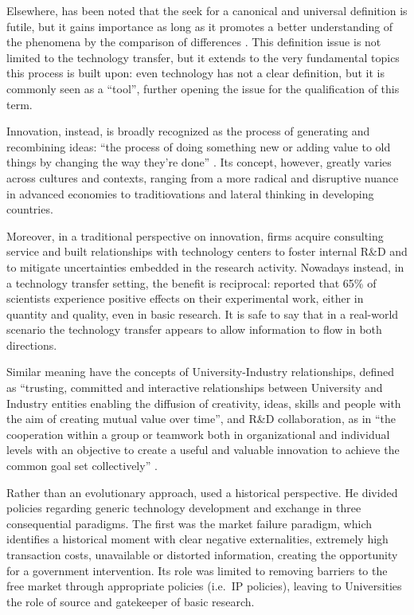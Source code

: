 Elsewhere, has been noted that the seek for a canonical and universal definition is futile, but it gains importance as long as it promotes a better understanding of the phenomena by the comparison of differences \citep{Bozeman2000}. This definition issue is not limited to the technology transfer, but it extends to the very fundamental topics this process is built upon: even technology has not a clear definition, but it is commonly seen as a \enquote{tool}, further opening the issue for the qualification of this term. 

Innovation, instead, is broadly recognized as the process of generating and recombining ideas: \enquote{the process of doing something new or adding value to old things by changing the way they're done} \citep{Baskaran2016}. Its concept, however, greatly varies across cultures and contexts, ranging from a more radical and disruptive nuance in advanced economies to traditiovations and lateral thinking in developing countries.

Moreover, in a traditional perspective on innovation, firms acquire consulting service and built relationships with technology centers to foster internal R\&D and to mitigate uncertainties embedded in the research activity. Nowadays instead, in a technology transfer setting, the benefit is reciprocal: \citet{Siegel2003a} reported that 65\% of scientists experience positive effects on their experimental work, either in quantity and quality, even in basic research. It is safe to say that in a real-world scenario the technology transfer appears to allow information to flow in both directions.

Similar meaning have the concepts of University-Industry relationships, defined as \enquote{trusting, committed and interactive relationships between University and Industry entities enabling the diffusion of creativity, ideas, skills and people with the aim of creating mutual value over time}, and R\&D collaboration, as in \enquote{the cooperation within a group or teamwork both in organizational and individual levels with an objective to create a useful and valuable innovation to achieve the common goal set collectively} \citep{Frasquet2012}. 

Rather than an evolutionary approach, \citet{Bozeman2000} used a historical perspective. He divided policies regarding generic technology development and exchange in three consequential paradigms. The first was the market failure paradigm, which identifies a historical moment with clear negative externalities, extremely high transaction costs, unavailable or distorted information, creating the opportunity for a government intervention. Its role was limited to removing barriers to the free market through appropriate policies (i.e.\ IP policies), leaving to Universities the role of source and gatekeeper of basic research.

